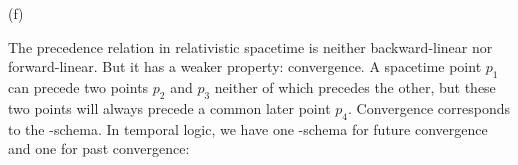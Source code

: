 \begin{solution}
\begin{sollist}
    \item[(f)] 
    \medskip
  \end{sollist}
\end{solution}


The precedence relation in relativistic spacetime is neither backward-linear nor
forward-linear. But it has a weaker property: convergence.
%
%
A spacetime point $p_1$ can precede two points $p_2$ and $p_3$ neither of which
precedes the other, but these two points will always precede a common later
point $p_4$. Convergence corresponds to the -schema. In temporal
logic, we have one -schema for future convergence and one for past
convergence:
%
\begin{principles}
\\
\end{principles}

